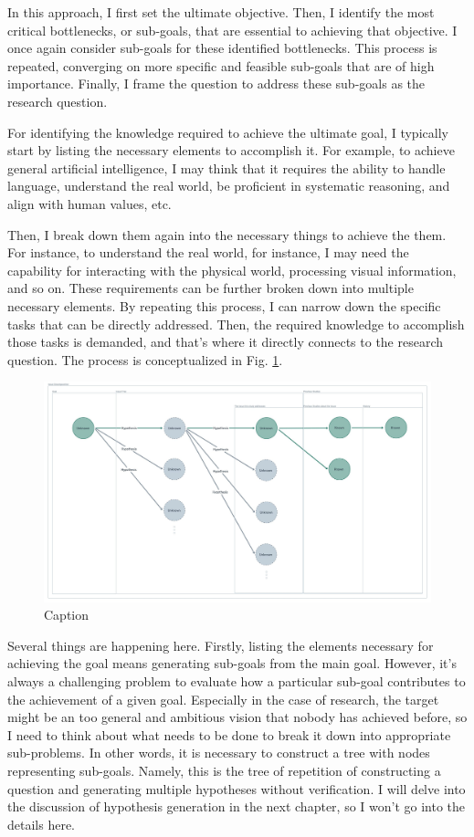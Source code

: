 In this approach, I first set the ultimate objective. Then, I identify the most critical bottlenecks, or sub-goals, that are essential to achieving that objective. I once again consider sub-goals for these identified bottlenecks. This process is repeated, converging on more specific and feasible sub-goals that are of high importance. Finally, I frame the question to address these sub-goals as the research question. 

For identifying the knowledge required to achieve the ultimate goal, I typically start by listing the necessary elements to accomplish it. For example, to achieve general artificial intelligence, I may think that it requires the ability to handle language, understand the real world, be proficient in systematic reasoning, and align with human values, etc. 

Then, I break down them again into the necessary things to achieve the them. For instance, to understand the real world, for instance, I may need the capability for interacting with the physical world, processing visual information, and so on. These requirements can be further broken down into multiple necessary elements. By repeating this process, I can narrow down the specific tasks that can be directly addressed. Then, the required knowledge to accomplish those tasks is demanded, and that's where it directly connects to the research question. The process is conceptualized in Fig. \ref{fig:unknown_tree}.


\begin{figure}[htb]
    \centering
    \includegraphics[width=\textwidth]{figs/unknown_tree.jpeg}
    \caption{Caption}
    \label{fig:unknown_tree}
\end{figure}

Several things are happening here. Firstly, listing the elements necessary for achieving the goal means generating sub-goals from the main goal. However, it's always a challenging problem to evaluate how a particular sub-goal contributes to the achievement of a given goal. Especially in the case of research, the target might be an too general and ambitious vision that nobody has achieved before, so I need to think about what needs to be done to break it down into appropriate sub-problems. In other words, it is necessary to construct a tree with nodes representing sub-goals. Namely, this is the tree of repetition of constructing a question and generating multiple hypotheses without verification. I will delve into the discussion of hypothesis generation in the next chapter, so I won't go into the details here.

